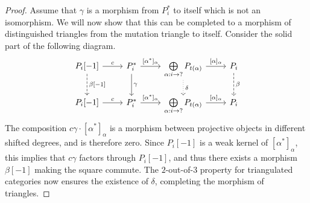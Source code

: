 \documentclass[12pt, dvipsnames, oneside]{amsart}
\theoremstyle{definition}
\begin{document}
\begin{proof}

Assume that $\gamma$ is a morphism from $P_i^*$ to itself which is not an isomorphism. We will now show that this can be completed to a morphism of distinguished triangles from the mutation triangle to itself. Consider the solid part of the following diagram.
\begin{equation*}
\begin{tikzcd}
P_i[-1] \arrow[r, "c"] \arrow[d, dashed, "{\beta[-1]}"] & P_i^* \arrow[r, "{[\alpha^*]_{\alpha}}"] \arrow[d, "{\gamma}"] & \bigoplus\limits_{\alpha:i\rightarrow ?}P_{t(\alpha)}  \arrow[r, "{[\alpha]_{\alpha}}"] \arrow[d, dotted, "{\delta}"] & P_i \arrow[d, dashed, "{\beta}"] \\
P_i[-1] \arrow[r, "c"] & P_i^* \arrow[r, "{[\alpha^*]_{\alpha}}"]  & \bigoplus\limits_{\alpha:i\rightarrow ?} P_{t(\alpha)}  \arrow[r, "{[\alpha]_{\alpha}}"] & P_i
\end{tikzcd}
\end{equation*}
The composition $c \gamma\cdot[\alpha^*]_{\alpha}$ is a morphism between projective objects in different shifted degrees, and is therefore zero. Since $P_i[-1]$ is a weak kernel of $[\alpha^*]_\alpha$, this implies that $c \gamma $ factors through $P_i[-1]$, and thus there exists a morphism $\beta[-1]$ making the square commute. The $2$-out-of-$3$ property for triangulated categories now ensures the existence of $\delta$, completing the morphism of triangles.  

\bigskip


\end{proof}
\end{document}
